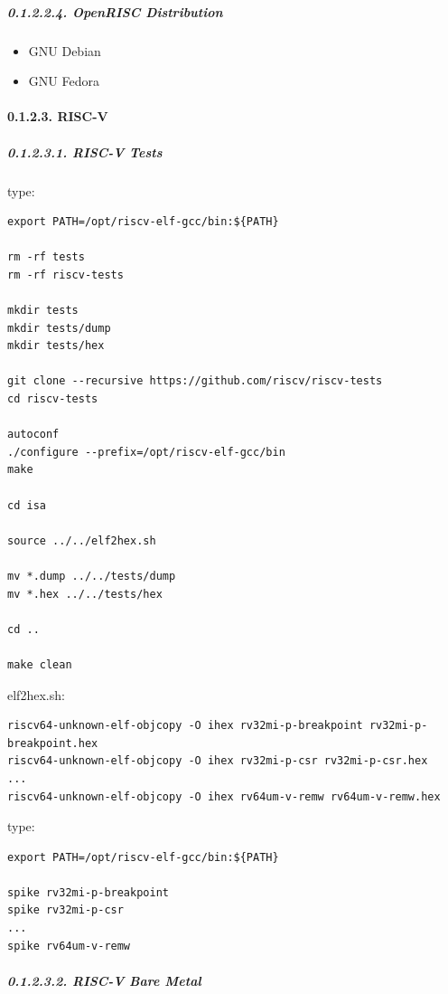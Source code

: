 \documentclass[
]{article}
\begin{document}
\hypertarget{openrisc-distribution-1}{%
\subparagraph{0.1.2.2.4. OpenRISC
Distribution}\label{openrisc-distribution-1}}

\begin{itemize}
\item
  GNU Debian
\item
  GNU Fedora
\end{itemize}

\hypertarget{risc-v-3}{%
\paragraph{0.1.2.3. RISC-V}\label{risc-v-3}}

\hypertarget{risc-v-tests-1}{%
\subparagraph{0.1.2.3.1. RISC-V Tests}\label{risc-v-tests-1}}

type:

\begin{verbatim}
export PATH=/opt/riscv-elf-gcc/bin:${PATH}

rm -rf tests
rm -rf riscv-tests

mkdir tests
mkdir tests/dump
mkdir tests/hex

git clone --recursive https://github.com/riscv/riscv-tests
cd riscv-tests

autoconf
./configure --prefix=/opt/riscv-elf-gcc/bin
make

cd isa

source ../../elf2hex.sh

mv *.dump ../../tests/dump
mv *.hex ../../tests/hex

cd ..

make clean
\end{verbatim}

elf2hex.sh:

\begin{verbatim}
riscv64-unknown-elf-objcopy -O ihex rv32mi-p-breakpoint rv32mi-p-breakpoint.hex
riscv64-unknown-elf-objcopy -O ihex rv32mi-p-csr rv32mi-p-csr.hex
...
riscv64-unknown-elf-objcopy -O ihex rv64um-v-remw rv64um-v-remw.hex
\end{verbatim}

type:

\begin{verbatim}
export PATH=/opt/riscv-elf-gcc/bin:${PATH}

spike rv32mi-p-breakpoint
spike rv32mi-p-csr
...
spike rv64um-v-remw
\end{verbatim}

\hypertarget{risc-v-bare-metal-1}{%
\subparagraph{0.1.2.3.2. RISC-V Bare Metal}\label{risc-v-bare-metal-1}}
\end{document}
